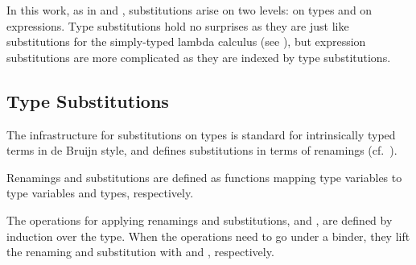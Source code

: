\documentclass[acmsmall,anonymous,review,screen]{acmart}
\begin{document}
In this work, as in \citet{DBLP:journals/jar/BentonHKM12} and
\citet{DBLP:conf/mpc/ChapmanKNW19}, substitutions arise on two levels:
on types and on expressions. Type substitutions hold no surprises as
they are just like substitutions for the simply-typed lambda calculus (see
\cite{DBLP:journals/scp/KokkeSW20}), but expression substitutions are
more complicated as they are indexed by type substitutions.

\subsection{Type Substitutions}
\label{sec:substitutions:type}

The infrastructure for substitutions on types is standard for
intrinsically typed terms in de Bruijn
style, and defines substitutions in terms of renamings
(cf.~\cite{DBLP:journals/jar/BentonHKM12, DBLP:conf/mpc/ChapmanKNW19, DBLP:journals/scp/KokkeSW20}).



Renamings {\ATRen} and substitutions {\ATSub} are defined as
functions mapping type variables to type variables and types, respectively.

\noindent\hspace{-\fboxsep}
\begin{minipage}{0.5\linewidth}
  \SubDefTRen
\end{minipage}
\begin{minipage}{0.5\linewidth}
  \SubDefTSub
\end{minipage}

The operations for applying renamings and substitutions, {\ATren}
and {\ATsub}, are defined by induction over the type. When the
operations need to go under a binder, they lift the renaming and
substitution with {\ATliftR} and {\ATliftS}, respectively.
\end{document}
